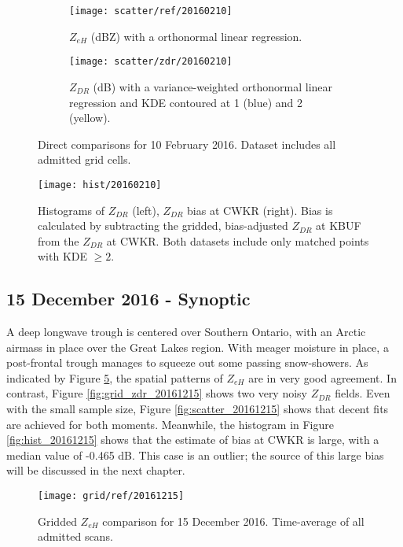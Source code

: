\begin{figure}[H]
\centering
   \begin{subfigure}[t]{0.48\linewidth} \centering
     \texttt{[image: scatter/ref/20160210]}
     \caption{$Z_{eH}$ (dBZ) with a orthonormal linear regression.}\label{fig:scatter_ref_20160210}
   \end{subfigure}
   \begin{subfigure}[t]{0.48\linewidth} \centering
     \texttt{[image: scatter/zdr/20160210]}
     \caption{$Z_{DR}$ (dB) with a variance-weighted orthonormal linear regression and KDE contoured at 1 (blue) and 2 (yellow).}\label{fig:scatter_zdr_20160210}
   \end{subfigure}
\caption{Direct comparisons for 10 February 2016. Dataset includes all admitted grid cells.} \label{fig:scatter_20160210}
\end{figure}

\begin{figure}[H]
\texttt{[image: hist/20160210]}\centering
\caption{Histograms of $Z_{DR}$ (left), $Z_{DR}$ bias at CWKR (right). Bias is calculated by subtracting the gridded, bias-adjusted $Z_{DR}$ at KBUF from the
$Z_{DR}$ at CWKR. Both datasets include only matched points with KDE $\geq 2$.} 
\label{fig:hist_20160210}
\end{figure}

\subsection{15 December 2016 - Synoptic}
A deep longwave trough is centered over Southern Ontario, with an Arctic airmass in place over the Great Lakes region. With meager moisture in place, a
post-frontal trough manages to squeeze out some passing snow-showers. As indicated by Figure \ref{fig:grid_ref_20161215}, the spatial patterns of $Z_{eH}$ are in very good agreement. In contrast, Figure \ref{fig:grid_zdr_20161215} shows two very noisy $Z_{DR}$ fields. Even with the small sample size, Figure \ref{fig:scatter_20161215} shows that decent fits are achieved for both moments. Meanwhile, the histogram in Figure \ref{fig:hist_20161215} shows that the estimate of bias at CWKR is large, with a median value of -0.465 dB. This case is an outlier; the source of this large bias will be discussed in the next chapter. 
\begin{figure}[p]
\texttt{[image: grid/ref/20161215]}
\caption{Gridded $Z_{eH}$ comparison for 15 December 2016. Time-average of all admitted scans.} 
\label{fig:grid_ref_20161215}
\end{figure}

